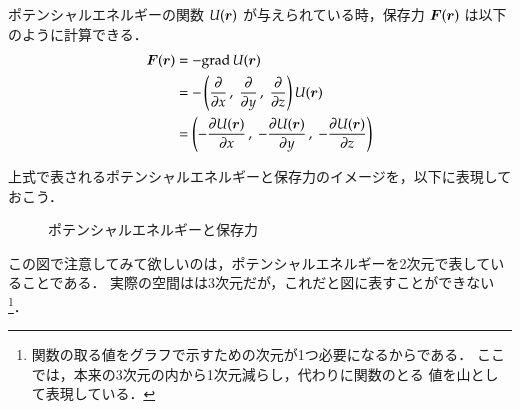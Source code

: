                    ポテンシャルエネルギーの関数 $U(\boldsymbol{r})$ が与えられている時，保存力 $\boldsymbol{F}(\boldsymbol{r})$ は以下のように計算できる．
                    \begin{align*}
                        \boldsymbol{F} (\boldsymbol{r}) &= - \mathrm{grad}\, U(\boldsymbol{r}) \\
                                  &= -\left(
                                                \frac{\partial}{\partial x}\,,\;
                                                \frac{\partial}{\partial y}\,,\;
                                                \frac{\partial}{\partial z}
                                     \right)  U(\boldsymbol{r}) \\
                                  &=  \left(
                                        - \frac{\partial U(\boldsymbol{r})}{\partial x}\,,\;
                                        - \frac{\partial U(\boldsymbol{r})}{\partial y}\,,\;
                                        - \frac{\partial U(\boldsymbol{r})}{\partial z}
                                     \right)
                        \end{align*}

                上式で表されるポテンシャルエネルギーと保存力のイメージを，以下に表現しておこう．
                    \begin{figure}[hbt]
                        \begin{center}
                            \caption{ポテンシャルエネルギーと保存力}
                            \label{fig:sensekibun_shukaisekibun_002}
                        \end{center}
                    \end{figure}

                この図で注意してみて欲しいのは，ポテンシャルエネルギーを2次元で表していることである．
                実際の空間はは3次元だが，これだと図に表すことができない
                        \footnote{
                            関数の取る値をグラフで示すための次元が1つ必要になるからである．
                            ここでは，本来の3次元の内から1次元減らし，代わりに関数のとる
                            値を山として表現している．
                        }．

